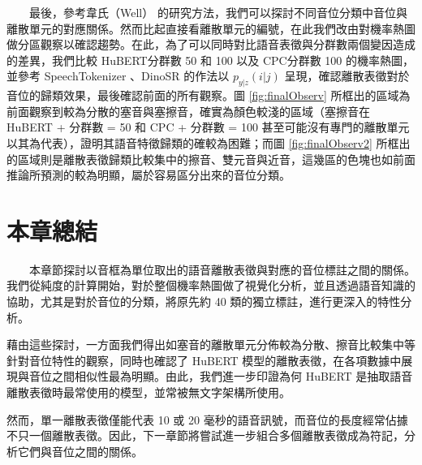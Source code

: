 　　最後，參考韋氏（Well） \cite{wells_phonetic_2022} 的研究方法，我們可以探討不同音位分類中音位與離散單元的對應關係。然而比起直接看離散單元的編號，在此我們改由對機率熱圖做分區觀察以確認趨勢。在此，為了可以同時對比語音表徵與分群數兩個變因造成的差異，我們比較 HuBERT分群數 50 和 100 以及 CPC分群數 100 的機率熱圖，並參考 SpeechTokenizer \cite{zhang2024speechtokenizer}、DinoSR \cite{liu2024dinosr} 的作法以 $p_{y|z}(i|j)$ 呈現，確認離散表徵對於音位的歸類效果，最後確認前面的所有觀察。圖 \ref{fig:finalObserv} 所框出的區域為前面觀察到較為分散的塞音與塞擦音，確實為顏色較淺的區域（塞擦音在 HuBERT + 分群數 = 50 和 CPC + 分群數 = 100 甚至可能沒有專門的離散單元以其為代表），證明其語音特徵歸類的確較為困難；而圖 \ref{fig:finalObserv2} 所框出的區域則是離散表徵歸類比較集中的擦音、雙元音與近音，這幾區的色塊也如前面推論所預測的較為明顯，屬於容易區分出來的音位分類。





{

\section{本章總結}


　　本章節探討以音框為單位取出的語音離散表徵與對應的音位標註之間的關係。我們從純度的計算開始，對於整個機率熱圖做了視覺化分析，並且透過語音知識的協助，尤其是對於音位的分類，將原先約 40 類的獨立標註，進行更深入的特性分析。

藉由這些探討，一方面我們得出如塞音的離散單元分佈較為分散、擦音比較集中等針對音位特性的觀察，同時也確認了 HuBERT 模型的離散表徵，在各項數據中展現與音位之間相似性最為明顯。由此，我們進一步印證為何 HuBERT 是抽取語音離散表徵時最常使用的模型，並常被無文字架構所使用。

        然而，單一離散表徵僅能代表 10 或 20 毫秒的語音訊號，而音位的長度經常佔據不只一個離散表徵。因此，下一章節將嘗試進一步組合多個離散表徵成為符記，分析它們與音位之間的關係。



}
